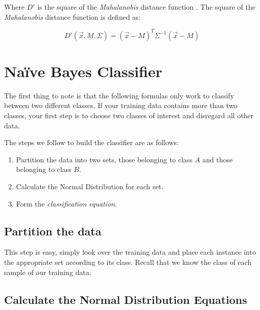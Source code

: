 \documentclass{article}
\begin{document}
Where $D'$ is the square of the \emph{Mahalanobis} distance function
\cite{wiki_mahalanobis}.  The square of the \emph{Mahalanobis} distance
function is defined as:

\begin{displaymath}
  D'(\vec{x},M,\Sigma) = (\vec{x}-M)^T \Sigma^{-1} (\vec{x}-M)
\end{displaymath}


\section{Na\"ive Bayes Classifier}
\label{sec:nbayes}

The first thing to note is that the following formulas only work to
classify between two different classes.  If your training data
contains more than two classes, your first step is to choose two
classes of interest and disregard all other data.

The steps we follow to build the classifier are as follows:

\begin{enumerate}

\item Partition the data into two sets, those belonging to class $A$
  and those belonging to class $B$.

\item Calculate the Normal Distribution for each set.

\item Form the \emph{classification equation}.

\end{enumerate}

\subsection{Partition the data}

This step is easy, simply look over the training data and place each
instance into the appropriate set according to its class.  Recall that
we know the class of each sample of our training data.

\subsection{Calculate the Normal Distribution Equations}
\label{ss:norm_dist}
\end{document}
